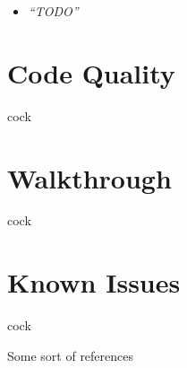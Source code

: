 \documentclass{article}
\begin{document}
\begin{multicols}{2}
\begin{itemize}[leftmargin=*]
                \item \textit{``TODO''}
            \end{itemize}

        \section{Code Quality}
        cock

        \section{Walkthrough}
        cock

        \section{Known Issues}
        cock
    \end{multicols}

    \begin{thebibliography}{9}
        Some sort of references
    \end{thebibliography}        
\end{document}
